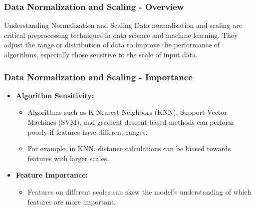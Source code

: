 \documentclass[aspectratio=169]{beamer}
\begin{document}
\begin{frame}[fragile]
    \frametitle{Data Normalization and Scaling - Overview}
    \begin{block}{Understanding Normalization and Scaling}
        Data normalization and scaling are critical preprocessing techniques in data science and machine learning. They adjust the range or distribution of data to improve the performance of algorithms, especially those sensitive to the scale of input data.
    \end{block}
\end{frame}

\begin{frame}[fragile]
    \frametitle{Data Normalization and Scaling - Importance}
    \begin{itemize}
        \item \textbf{Algorithm Sensitivity:} 
        \begin{itemize}
            \item Algorithms such as K-Nearest Neighbors (KNN), Support Vector Machines (SVM), and gradient descent-based methods can perform poorly if features have different ranges.
            \item For example, in KNN, distance calculations can be biased towards features with larger scales.
        \end{itemize}
        
        \item \textbf{Feature Importance:} 
        \begin{itemize}
            \item Features on different scales can skew the model's understanding of which features are more important.
        \end{itemize}
    \end{itemize}
\end{frame}
\end{document}
